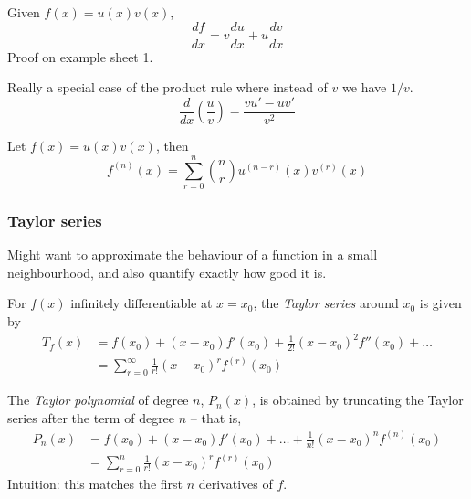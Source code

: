 \documentclass{../../template/note}
\begin{document}
    \begin{theorem}
        Given \(f(x) = u(x)v(x)\),
        \[
            \frac{df}{dx} = v \frac{du}{dx} + u \frac{dv}{dx}
        \]
        Proof on example sheet 1.
    \end{theorem}
    
    \begin{theorem}
        Really a special case of the product rule where instead of \(v\) we have \(1/v\).
        \[
            \frac{d}{dx} \left(\frac{u}{v}\right) = \frac{vu'-uv'}{v^2}
        \]
    \end{theorem}
    
    \begin{theorem}
        Let \(f(x) = u(x)v(x)\), then
        \[
            f^{(n)}(x) = \sum_{r=0}^n \binom{n}{r} u^{(n-r)}(x) v^{(r)}(x) 
        \]
    \end{theorem}
    
    \subsubsection{Taylor series}

    Might want to approximate the behaviour of a function in a small neighbourhood, and also quantify exactly how good it is.


    \begin{definition}
        For \(f(x)\) infinitely differentiable at \(x=x_0\), the \emph{Taylor series} around \(x_0\) is given by
        \begin{align*}
            T_f(x) &= f(x_0) + (x-x_0)f'(x_0) + \frac{1}{2!}(x-x_0)^2f''(x_0) + \dots \\
            &= \sum_{r=0}^\infty \frac{1}{r!}(x-x_0)^rf^{(r)}(x_0)
        \end{align*}
    \end{definition}
    
    \begin{definition}
        The \emph{Taylor polynomial} of degree \(n\), \(P_n(x)\), is obtained by truncating the Taylor series after the term of degree \(n\) -- that is,
        \begin{align*}
            P_n(x) &= f(x_0) + (x-x_0)f'(x_0) + \dots + \frac{1}{n!}(x-x_0)^n f^{(n)}(x_0) \\
            &= \sum_{r=0}^n \frac{1}{r!}(x-x_0)^rf^{(r)}(x_0)
        \end{align*}
        Intuition: this matches the first \(n\) derivatives of \(f\).
        
    \end{definition}
    
\end{document}
